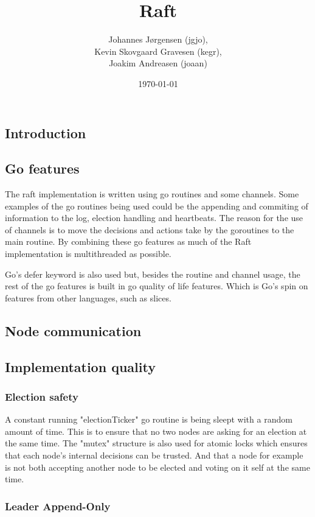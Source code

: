 \documentclass[a4paper,11pt]{article}
\title{Raft}
\author{Johannes Jørgensen (jgjo),\\ Kevin Skovgaard Gravesen (kegr),\\ Joakim Andreasen (joaan)}
\date{\today}
\begin{document}
 

\maketitle

\subsection*{Introduction}

\subsection*{Go features}
The raft implementation is written using go routines and some channels.
Some examples of the go routines being used could be the appending and commiting of information to the log, election handling and heartbeats.
The reason for the use of channels is to move the decisions and actions take by the goroutines to the main routine.
By combining these go features as much of the Raft implementation is multithreaded as possible.

Go's defer keyword is also used but, besides the routine and channel usage, the rest of the go features is built in go quality of life features.
Which is Go's spin on features from other languages, such as slices.

\subsection*{Node communication}

\subsection*{Implementation quality}

\subsubsection*{Election safety}
A constant running "electionTicker" go routine is being sleept with a random amount of time.
This is to ensure that no two nodes are asking for an election at the same time.
The "mutex" structure is also used for atomic locks which ensures that each node's internal decisions can be trusted.
And that a node for example is not both accepting another node to be elected and voting on it self at the same time.

\subsubsection*{Leader Append-Only}
\end{document}
